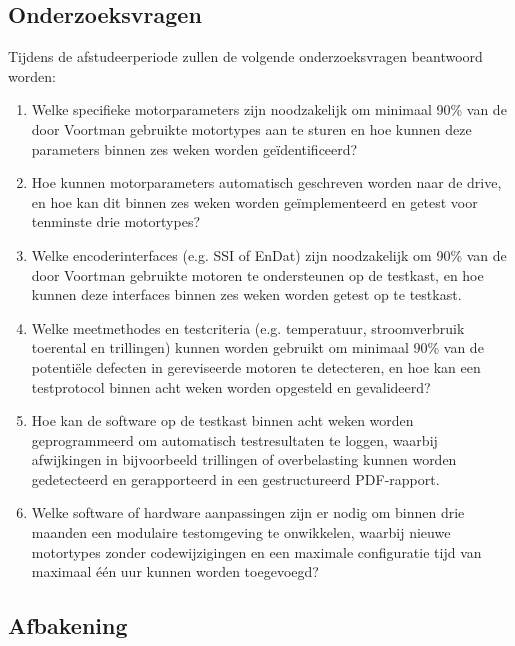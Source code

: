 \newpage

\subsection{Onderzoeksvragen}

Tijdens de afstudeerperiode zullen de volgende onderzoeksvragen beantwoord worden:

\begin{enumerate}
	\item Welke specifieke motorparameters zijn noodzakelijk om minimaal 90\% van de door Voortman gebruikte motortypes aan te sturen en hoe kunnen deze parameters binnen zes weken worden geïdentificeerd? \label{OZV:1}
	
	\item Hoe kunnen motorparameters automatisch geschreven worden naar de drive, en hoe kan dit binnen zes weken worden geïmplementeerd en getest voor tenminste drie motortypes? \label{OZV:2}
	
	\item Welke encoderinterfaces (e.g. \gls{SSI} of EnDat) zijn noodzakelijk om 90\% van de door Voortman gebruikte motoren te ondersteunen op de testkast, en hoe kunnen deze interfaces binnen zes weken worden getest op te testkast. \label{OZV:3}
	
	\item Welke meetmethodes en testcriteria (e.g. temperatuur, stroomverbruik toerental en trillingen) kunnen worden gebruikt om minimaal 90\% van de potentiële defecten in gereviseerde motoren te detecteren, en hoe kan een testprotocol binnen acht weken worden opgesteld en gevalideerd? \label{OZV:4}
	
	\item Hoe kan de software op de testkast binnen acht weken worden geprogrammeerd om automatisch testresultaten te loggen, waarbij afwijkingen in bijvoorbeeld trillingen of overbelasting kunnen worden gedetecteerd en gerapporteerd in een gestructureerd \gls{PDF}-rapport. \label{OZV:5}
	
	\item Welke software of hardware aanpassingen zijn er nodig om binnen drie maanden een modulaire testomgeving te onwikkelen, waarbij nieuwe motortypes zonder codewijzigingen en een maximale configuratie tijd van maximaal één uur kunnen worden toegevoegd? \label{OZV:6}
\end{enumerate}

\newpage

\subsection{Afbakening}

